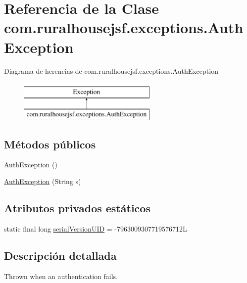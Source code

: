 \hypertarget{classcom_1_1ruralhousejsf_1_1exceptions_1_1_auth_exception}{}\section{Referencia de la Clase com.\+ruralhousejsf.\+exceptions.\+Auth\+Exception}
\label{classcom_1_1ruralhousejsf_1_1exceptions_1_1_auth_exception}
Diagrama de herencias de com.\+ruralhousejsf.\+exceptions.\+Auth\+Exception\begin{figure}[H]
\begin{center}
\leavevmode
\includegraphics[height=2.000000cm]{d3/d6c/classcom_1_1ruralhousejsf_1_1exceptions_1_1_auth_exception}
\end{center}
\end{figure}
\subsection*{Métodos públicos}
\begin{DoxyCompactItemize}
\item 
\mbox{\hyperlink{classcom_1_1ruralhousejsf_1_1exceptions_1_1_auth_exception_a092e5eb20bddab6f6741d8a04c7f05a2}{Auth\+Exception}} ()
\item 
\mbox{\hyperlink{classcom_1_1ruralhousejsf_1_1exceptions_1_1_auth_exception_ac4b5a1b9673da9a2de397154017a0c1e}{Auth\+Exception}} (String s)
\end{DoxyCompactItemize}
\subsection*{Atributos privados estáticos}
\begin{DoxyCompactItemize}
\item 
static final long \mbox{\hyperlink{classcom_1_1ruralhousejsf_1_1exceptions_1_1_auth_exception_a0bda3b553296d4340933a563b323bb5f}{serial\+Version\+U\+ID}} = -\/7963009307719576712L
\end{DoxyCompactItemize}


\subsection{Descripción detallada}
Thrown when an authentication fails. 

